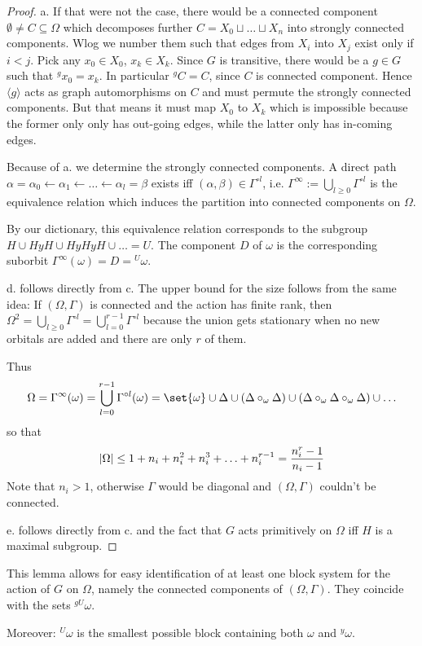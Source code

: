 \documentclass[fontsize=11pt,fleqn,a4paper]{scrartcl}
\begin{document}
\begin{proof}
a. If that were not the case, there would be a connected component $\emptyset\neq C\subseteq\Omega$ which decomposes further $C=X_0 \sqcup \ldots \sqcup X_n$ into strongly connected components. Wlog we number them such that edges from $X_i$ into $X_j$ exist only if $i<j$. Pick any $x_0\in X_0$, $x_k\in X_k$. Since $G$ is transitive, there would be a $g\in G$ such that ${^g x_0} =x_k$. In particular ${^g C}=C$, since $C$ is connected component. Hence $\langle g\rangle$ acts as graph automorphisms on $C$ and must permute the strongly connected components. But that means it must map $X_0$ to $X_k$ which is impossible because the former only only has out-going edges, while the latter only has in-coming edges.

\medbreak
Because of a. we determine the strongly connected components. A direct path $\alpha=\alpha_0\leftarrow\alpha_1\leftarrow\ldots\leftarrow\alpha_l=\beta$ exists iff $(\alpha,\beta)\in\Gamma^{\circ l}$, i.e. $\Gamma^{\infty}:=\bigcup_{l\geq 0} \Gamma^{\circ l}$ is the equivalence relation which induces the partition into connected components on $\Omega$.

By our dictionary, this equivalence relation corresponds to the subgroup $H\cup HyH \cup HyHyH \cup \ldots=U$. The component $D$ of $\omega$ is the corresponding suborbit $\Gamma^\infty(\omega)=D={^U \omega}$.

\medbreak
d. follows directly from c. The upper bound for the size follows from the same idea: If $(\Omega,\Gamma)$ is connected and the action has finite rank, then $\Omega^2 = \bigcup_{l\geq 0} \Gamma^{\circ l} = \bigcup_{l=0}^{r-1} \Gamma^{\circ l}$ because the union gets stationary when no new orbitals are added and there are only $r$ of them.

Thus
\[\Omega = \Gamma^\infty(\omega) = \bigcup_{l=0}^{r-1} \Gamma^{\circ l}(\omega) = \set{\omega} \cup \Delta \cup (\Delta\circ_\omega\Delta) \cup (\Delta\circ_\omega\Delta\circ_\omega\Delta) \cup \ldots\]
so that
\[\lvert\Omega\rvert \leq 1 + n_i + n_i^2 + n_i^3 + \ldots + n_i^{r-1} = \frac{n_i^r-1}{n_i-1}\]
Note that $n_i>1$, otherwise $\Gamma$ would be diagonal and $(\Omega,\Gamma)$ couldn't be connected.

\medbreak
e. follows directly from c. and the fact that $G$ acts primitively on $\Omega$ iff $H$ is a maximal subgroup.
\end{proof}

\begin{remark}
This lemma allows for easy identification of at least one block system for the action of $G$ on $\Omega$, namely the connected components of $(\Omega,\Gamma)$. They coincide with the sets ${^{gU}\omega}$.

Moreover: ${^U \omega}$ is the smallest possible block containing both $\omega$ and ${^y \omega}$.
\end{remark}
\end{document}

